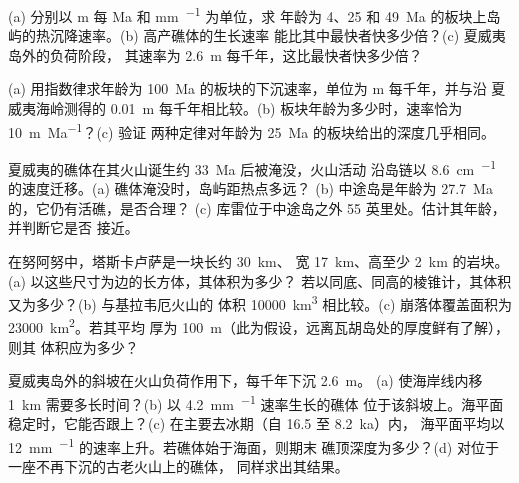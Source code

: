 \begin{exercise}[$\star\star$]\label{exo:b2:oceanic-islands:5}
(a) 分别以 \unit{m} 每 \unit{Ma} 和 \unit{mm.^{-1}} 为单位，求
年龄为 4、25 和 \qty{49}{Ma} 的板块上岛屿的热沉降速率。(b) 高产礁体的生长速率
能比其中最快者快多少倍？(c) 夏威夷岛外的负荷阶段，
其速率为 \qty{2.6}{m} 每千年，这比最快者快多少倍？
\end{exercise}

\begin{exercise}[$\star\star$]\label{exo:b2:oceanic-islands:6}
(a) 用指数律求年龄为 \qty{100}{Ma} 的板块的下沉速率，单位为 \unit{m}
每千年，并与沿
夏威夷海岭测得的 \qty{0.01}{m} 每千年相比较。(b) 板块年龄为多少时，速率恰为 \qty{10}{m.Ma^{-1}}？(c) 验证
两种定律对年龄为 \qty{25}{Ma} 的板块给出的深度几乎相同。
\end{exercise}

\begin{exercise}[$\star\star$]\label{exo:b2:oceanic-islands:7}
夏威夷的礁体在其火山诞生约 \qty{33}{Ma} 后被淹没，火山活动
沿岛链以 \qty{8.6}{cm.^{-1}} 的速度迁移。(a) 礁体淹没时，岛屿距热点多远？
(b) 中途岛是年龄为 \qty{27.7}{Ma} 的，它仍有活礁，是否合理？
(c) 库雷位于中途岛之外 55 英里处。估计其年龄，并判断它是否
接近。
\end{exercise}

\begin{exercise}[$\star\star$]\label{exo:b2:oceanic-islands:8}
在努阿努中，塔斯卡卢萨是一块长约 \qty{30}{km}、
宽 \qty{17}{km}、高至少 \qty{2}{km} 的岩块。(a) 以这些尺寸为边的长方体，其体积为多少？
若以同底、同高的棱锥计，其体积又为多少？(b) 与基拉韦厄火山的
体积 \qty{10000}{km^3} 相比较。(c) 崩落体覆盖面积为 \qty{23000}{km^2}。若其平均
厚为 \qty{100}{m}（此为假设，远离瓦胡岛处的厚度鲜有了解），则其
体积应为多少？
\end{exercise}

\begin{exercise}[$\star\star$]\label{exo:b2:oceanic-islands:9}
夏威夷岛外的斜坡在火山负荷作用下，每千年下沉 \qty{2.6}{m}。
(a) 使海岸线内移 \qty{1}{km} 需要多长时间？(b) 以 \qty{4.2}{mm.^{-1}} 速率生长的礁体
位于该斜坡上。海平面稳定时，它能否跟上？(c) 在主要去冰期（自 16.5 至 \qty{8.2}{ka}）内，
海平面平均以 \qty{12}{mm.^{-1}} 的速率上升。若礁体始于海面，则期末
礁顶深度为多少？(d) 对位于一座不再下沉的古老火山上的礁体，
同样求出其结果。
\end{exercise}

